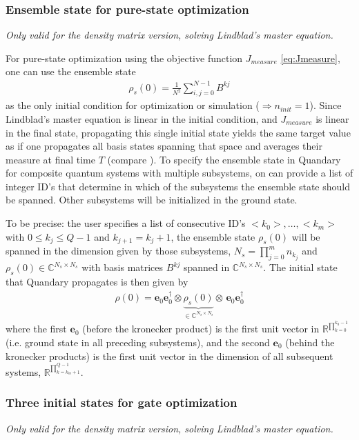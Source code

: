 \documentclass[11pt]{article}
\newcommand{\R}{\mathds{R}}
\newcommand{\C}{\mathds{C}}
\newcommand{\bs}[1]{{\boldsymbol{#1}}}
\begin{document}
\subsubsection{Ensemble state for pure-state optimization}\label{sec:ensemblestate}
\textit{Only valid for the density matrix version, solving Lindblad's master equation.}

For pure-state optimization using the objective function $J_{measure}$ \eqref{eq:Jmeasure}, one can use the ensemble state 
\begin{align}\label{eq:ensemblestate}
  \rho_s(0) = \frac{1}{N^2}\sum_{i,j=0}^{N-1} B^{kj}
\end{align}
as the only initial condition for optimization or simulation ($\Rightarrow n_{init}=1$). Since Lindblad's master equation is linear in the initial condition, and $J_{measure}$ is linear in the final state, propagating this single initial state yields the same target value as if one propagates all basis states spanning that space and averages their measure at final time $T$ (compare \cite{guenther2021quantum}). To specify the ensemble state in Quandary for composite quantum systems with multiple subsystems, on can provide a list of integer ID's that determine in which of the subsystems the ensemble state should be spanned. Other subsystems will be initialized in the ground state. 

To be precise: the user specifies a list of consecutive ID's $<k_0>, \dots, <k_m>$ with $0 \leq k_j \leq Q-1$ and $k_{j+1} = k_j+1$, the ensemble state $\rho_s(0)$ will be spanned in the dimension given by those subsystems, $N_s = \prod_{j=0}^{m} n_{k_j}$ and $\rho_s(0) \in \C^{N_s\times N_s}$ with basis matrices $B^{kj}$ spanned in $\C^{N_s\times N_s}$. The initial state that Quandary propagates is then given by 
\begin{align}
  \rho(0) = \bs{e}_0\bs{e}_0^\dagger \otimes \underbrace{\rho_s(0)}_{\in \C^{N_s\times N_s}} \otimes \, \bs{e}_0 \bs{e}_0^\dagger
\end{align}
where the first $\bs{e}_0$ (before the kronecker product) is the first unit vector in $\R^{\prod_{k=0}^{k_0-1}}$ (i.e. ground state in all preceding subsystems), and the second $\bs{e}_0$ (behind the kronecker products) is the first unit vector in the dimension of all subsequent systems, $\R^{\prod_{k=k_m+1}^{Q-1}}$. 

\subsubsection{Three initial states for gate optimization}\label{subsec:threeinitcond}
\textit{Only valid for the density matrix version, solving Lindblad's master equation.}
\end{document}

